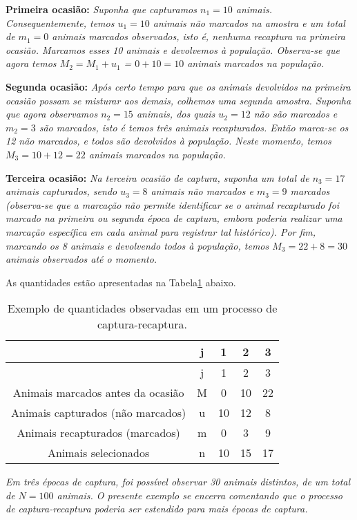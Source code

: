 \documentclass[
]{book}
\begin{document}
\textbf{Primeira ocasião:} \emph{Suponha que capturamos \(n_1 = 10\) animais. Consequentemente, temos \(u_1=10\) animais não marcados na amostra e um total de \(m_1=0\) animais marcados observados, isto é, nenhuma recaptura na primeira ocasião. Marcamos esses 10 animais e devolvemos à população. Observa-se que agora temos \(M_2 = M_1+u_1\) = \(0+10 = 10\) animais marcados na população.}

\textbf{Segunda ocasião:} \emph{Após certo tempo para que os animais devolvidos na primeira ocasião possam se misturar aos demais, colhemos uma segunda amostra. Suponha que agora observamos \(n_2 = 15\) animais, dos quais \(u_2=12\) não são marcados e \(m_2=3\) são marcados, isto é temos três animais recapturados. Então marca-se os 12 não marcados, e todos são devolvidos à população. Neste momento, temos \(M_3 = 10+12=22\) animais marcados na população.}

\textbf{Terceira ocasião:} \emph{Na terceira ocasião de captura, suponha um total de \(n_3=17\) animais capturados, sendo \(u_3 = 8\) animais não marcados e \(m_3 = 9\) marcados (observa-se que a marcação não permite identificar se o animal recapturado foi marcado na primeira ou segunda época de captura, embora poderia realizar uma marcação específica em cada animal para registrar tal histórico). Por fim, marcando os 8 animais e devolvendo todos à população, temos \(M_3=22 + 8 = 30\) animais observados até o momento.}

As quantidades estão apresentadas na Tabela\ref{tab:nice-tab} abaixo.

\begin{longtable}[]{@{}ccccc@{}}
\caption{\label{tab:nice-tab}Exemplo de quantidades observadas em um processo de captura-recaptura.}\tabularnewline
\toprule\noalign{}
& j & 1 & 2 & 3 \\
\midrule\noalign{}
\endfirsthead
\toprule\noalign{}
& j & 1 & 2 & 3 \\
\midrule\noalign{}
\endhead
\bottomrule\noalign{}
\endlastfoot
Animais marcados antes da ocasião & M & 0 & 10 & 22 \\
Animais capturados (não marcados) & u & 10 & 12 & 8 \\
Animais recapturados (marcados) & m & 0 & 3 & 9 \\
Animais selecionados & n & 10 & 15 & 17 \\
\end{longtable}

\emph{Em três épocas de captura, foi possível observar 30 animais distintos, de um total de \(N=100\) animais. O presente exemplo se encerra comentando que o processo de captura-recaptura poderia ser estendido para mais épocas de captura.}
\end{document}
